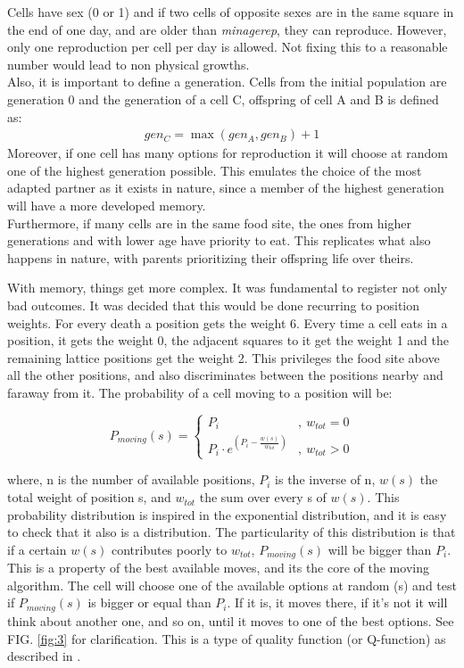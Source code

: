\documentclass[a4paper,prd,twocolumn,nofootinbib,superscriptaddress,floatfix]{revtex4}
\begin{document}
Cells have sex (0 or 1) and if two cells of opposite sexes are in the same square in the end of one day, and are older than \textit{minagerep}, they can reproduce. However, only one reproduction per cell per day is allowed. Not fixing this to a reasonable number would lead to non physical growths.\\
Also, it is important to define a generation. Cells from the initial population are generation 0 and the generation of a cell C, offspring of cell A and B is defined as:
\begin{align*}
gen_C=\max(gen_A,gen_B)+1
\end{align*}
Moreover, if one cell has many options for reproduction it will choose at random one of the highest generation possible. This emulates the choice of the most adapted partner as it exists in nature, since a member of the highest generation will have a more developed memory.\\
Furthermore, if many cells are in the same food site, the ones from higher generations and with lower age have priority to eat. This replicates what also happens in nature, with parents prioritizing their offspring life over theirs.

With memory, things get more complex. It was fundamental to register not only bad outcomes. It was decided that this would be done recurring to position weights. For every death a position gets the weight 6. Every time a cell eats in a position, it gets the weight 0, the adjacent squares to it get the weight 1 and the remaining lattice positions get the weight 2. This privileges the food site above all the other positions, and also discriminates between the positions nearby and faraway from it. The probability of a cell moving to a position will be:




\[
  P_{moving}(s)=
  \begin{cases}
     P_i & , \ w_{tot}=0 \\
     P_i\cdot e^{(P_i-\frac{w(s)}{w_{tot}}) } & ,\ w_{tot}>0
  \end{cases}
\]


where, n is the number of available positions, $P_i$ is the inverse of n, $w(s)$ the total weight of position s, and $w_{tot}$ the sum over every s of $w(s)$.
   This probability distribution is inspired in the exponential distribution, and it is easy to check that it also is a distribution. The particularity of this distribution is that if a certain $w(s)$ contributes poorly to $w_{tot}$,  $P_{moving}(s)$ will be bigger than $P_i$. This is a property of the best available moves, and its the core of the moving algorithm. The cell will choose one of the available options at random (s) and test if $P_{moving}(s)$ is bigger or equal than $P_i$. If it is, it moves there, if it's not it will think about another one, and so on, until it moves to one of the best options. See FIG. \ref{fig:3} for clarification. This is a type of quality function (or Q-function) as described in \cite{qfunction}.
\end{document}
